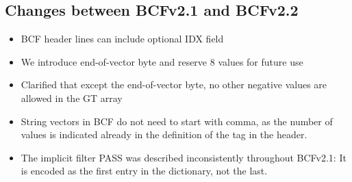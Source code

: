\documentclass[8pt]{article}
\begin{document}
\subsection{Changes between BCFv2.1 and BCFv2.2}
\begin{itemize}
\item BCF header lines can include optional IDX field
\item We introduce end-of-vector byte and reserve 8 values for future use
\item Clarified that except the end-of-vector byte, no other negative values are allowed in the GT array 
\item String vectors in BCF do not need to start with comma, as the number of values is indicated already in the definition of the tag in the header.
\item The implicit filter PASS was described inconsistently throughout BCFv2.1: It is encoded as the first entry in the dictionary, not the last.
\end{itemize}
\end{document}
